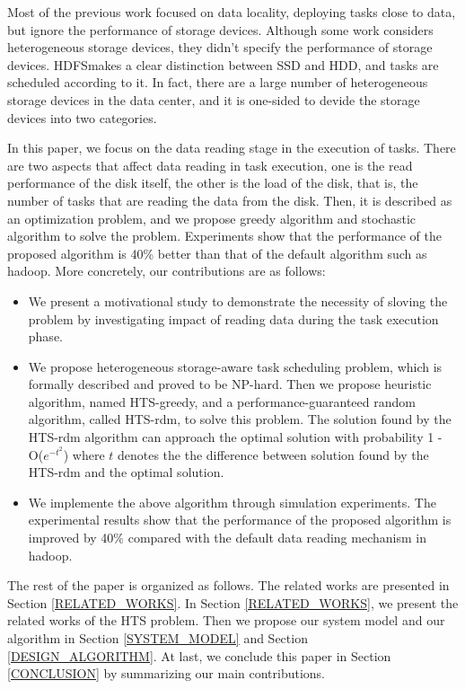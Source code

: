\documentclass[conference]{IEEEtran}
\begin{document}
Most of the previous work focused on data locality\cite{b18}, deploying tasks close to data, but ignore the performance of storage devices. Although some work \cite{b1}\cite{b6}\cite{b7} considers heterogeneous storage devices, they didn't specify the performance of storage devices. HDFS\cite{b19}makes a clear distinction between SSD and HDD, and tasks are scheduled according to it. In fact, there are a large number of heterogeneous storage devices in the data center, and it is one-sided to devide the storage devices into two categories.

In this paper, we focus on the data reading stage in the execution of tasks. There are two aspects that affect data reading in task execution, one is the read performance of the disk itself, the other is the load of the disk, that is, the number of tasks that are reading the data from the disk. Then, it is described as an optimization problem, and we propose greedy algorithm and stochastic algorithm to solve the problem. Experiments show that the performance of the proposed algorithm is 40\% better than that of the default algorithm such as hadoop. More concretely, our contributions are as follows: 
\begin{itemize}
\item We present a motivational study to demonstrate the necessity of sloving the problem by investigating impact of reading data during the task execution phase.
\item We propose heterogeneous storage-aware task scheduling problem,  which is formally described and proved to be NP-hard. Then we propose  heuristic algorithm, named HTS-greedy, and  a performance-guaranteed
random algorithm, called HTS-rdm, to solve this problem. The solution found by the HTS-rdm algorithm can approach the optimal solution with probability  1 - O($e^{-t^2}$) where $t$ denotes the 
the difference between solution found by the HTS-rdm and the optimal solution.
\item We implemente the above algorithm through simulation experiments. The experimental results show that the performance of the proposed algorithm is improved by 40\% compared with the default data reading mechanism in hadoop.
\end{itemize}

The rest of the paper is organized as follows. The related works are presented in Section \ref{RELATED_WORKS}. In Section \ref{RELATED_WORKS}, we present the related works of the HTS problem. Then we propose our system model and our algorithm in Section  \ref{SYSTEM_MODEL} and Section  \ref{DESIGN_ALGORITHM}. At last, we conclude this paper in Section \ref{CONCLUSION} by summarizing our main contributions.
\end{document}
